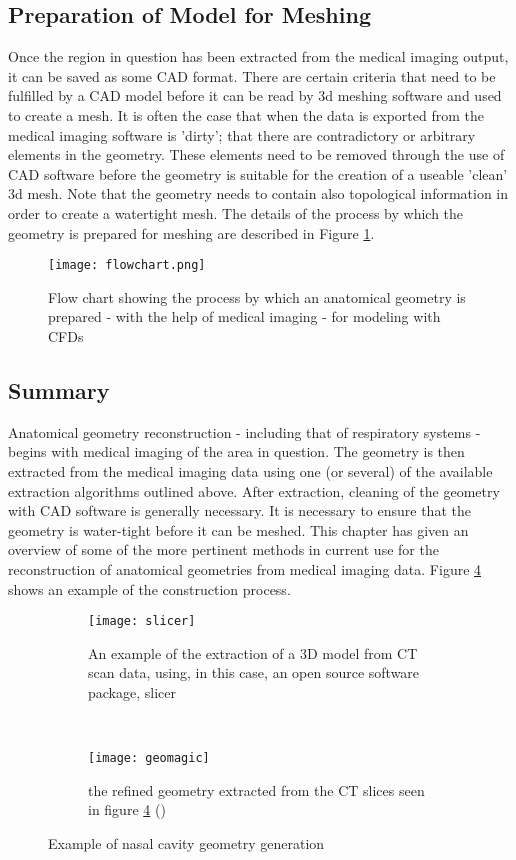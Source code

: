 \subsection{Preparation of Model for Meshing}

Once the region in question has been extracted from the medical imaging output, it can be saved as some CAD format. There are certain criteria that need to be fulfilled by a CAD model before it can be read by 3d meshing software and used to create a mesh. It is often the case that when the data is exported from the medical imaging software is 'dirty'; that there are contradictory or arbitrary elements in the geometry. These elements need to be removed through the use of CAD software before the geometry is suitable for the creation of a useable 'clean' 3d mesh. Note that the geometry needs to contain also topological information in order to create a watertight mesh. The details of the process by which the geometry is prepared for meshing are described in Figure \ref{fig:segchart}.


\begin{figure}
  \texttt{[image: flowchart.png]}
\caption{Flow chart showing the process by which an anatomical geometry is prepared - with the help of medical imaging - for modeling with CFDs} \label{fig:segchart}
\centering
\end{figure}

\subsection{Summary} 

Anatomical geometry reconstruction - including that of respiratory systems - begins with medical imaging of the area in question. The geometry is then extracted from the medical imaging data using one (or several) of the available extraction algorithms outlined above. After extraction, cleaning of the geometry with CAD software is generally necessary. It is necessary to ensure that the geometry is water-tight before it can be meshed. This chapter has given an overview of some of the more pertinent methods in current use for the reconstruction of anatomical geometries from medical imaging data. Figure \ref{fig:cavzamp} shows an example of the construction process.

\begin{figure}[t!]

  \begin{subfigure}[t]{0.5\textwidth} 
    \texttt{[image: slicer]}
    \caption{An example of the extraction of a 3D model from CT scan data, using, in this case, an open source software package, slicer}
    \label{fig:slicer}
  \end{subfigure}%
  ~ %
  \begin{subfigure}[t]{0.5\textwidth} 
    \texttt{[image: geomagic]}
    \caption{the refined geometry extracted from the CT slices seen in figure \ref{fig:cavzamp} ()}
    \label{fig:geomag}
  \end{subfigure}

  \caption{Example of nasal cavity geometry generation}
  \label{fig:cavzamp}
\end{figure}
 
